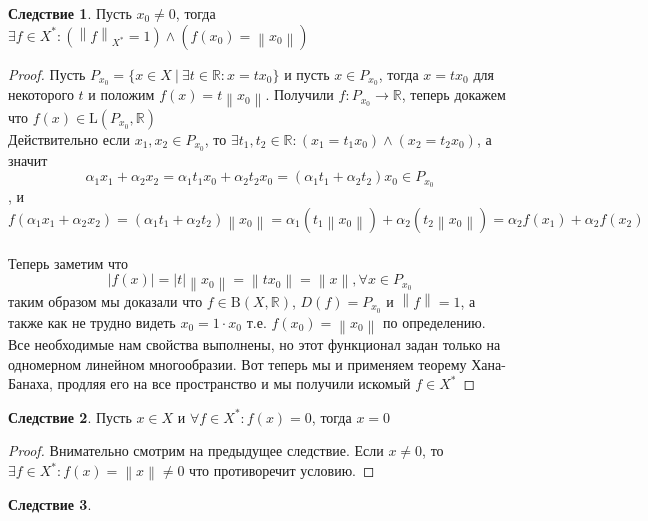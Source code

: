 \documentclass[12pt,a4paper]{article}
\theoremstyle{definition}
\newtheorem{corollary}{Следствие}[theorem]
\newcommand{\Real}{\mathbb{R}}
\newcommand{\norm}[1]{\left\lVert#1\right\rVert}
\newcommand{\setbuild}[2]{\{#1\:|\:#2\}}
\newcommand{\bounded}[2]{\textrm{B}(#1, #2)}
\newcommand{\linear}[2]{\textrm{L}(#1, #2)}
\begin{document}
\begin{corollary}
	Пусть $x_0 \neq 0$, тогда \\ $\exists f\in X^*: (\norm{f}_{X^*} = 1) \wedge (f(x_0) = \norm{x_0})$
\end{corollary}
\begin{proof}
	Пусть $P_{x_0} = \setbuild{x\in X}{\exists t\in\Real: x = tx_0}$ и пусть $x\in P_{x_0}$, тогда $x=tx_0$ для некоторого $t$ и положим $f(x)=t\norm{x_0}$. Получили $f:P_{x_0} \to \Real$, теперь докажем что $f(x)\in \linear{P_{x_0}}{\Real}$ \\
	
	Действительно если $x_1,x_2 \in P_{x_0}$, то $\exists t_1,t_2\in\Real: (x_1 = t_1 x_0) \wedge (x_2 = t_2 x_0)$, а значит $$\alpha_1 x_1 + \alpha_2 x_2 = \alpha_1 t_1 x_0 + \alpha_2 t_2 x_0 = (\alpha_1 t_1 + \alpha_2 t_2)  x_0 \in P_{x_0}$$, и $$f(\alpha_1 x_1 + \alpha_2 x_2) = (\alpha_1 t_1 + \alpha_2 t_2)\norm{x_0} = \alpha_1 (t_1 \norm{x_0}) + \alpha_2 (t_2 \norm{x_0}) = \alpha_2 f(x_1) + \alpha_2 f(x_2)$$ \\
	
	Теперь заметим что $$|f(x)| = |t|\norm{x_0} = \norm{tx_0} = \norm{x}, \forall x \in P_{x_0}$$ таким образом мы доказали что $f\in\bounded{X}{\Real}$, $D(f) = P_{x_0}$ и $\norm{f} = 1$, а также как не трудно видеть $x_0 = 1\cdot x_0$ т.е. $f(x_0) = \norm{x_0}$ по определению. Все необходимые нам свойства выполнены, но этот функционал задан только на одномерном линейном многообразии. Вот теперь мы и применяем теорему Хана-Банаха, продляя его на все пространство и мы получили искомый $f\in X^*$
\end{proof}

\begin{corollary}
	Пусть $x\in X$ и $\forall f \in X^* : f(x)=0$, тогда $x = 0$
\end{corollary}
\begin{proof}
	Внимательно смотрим на предыдущее следствие. Если $x \neq 0$, то $\exists f \in X^*: f(x) = \norm{x} \neq 0$ что противоречит условию.
\end{proof}

\begin{corollary}
	
\end{corollary}
\end{document}
